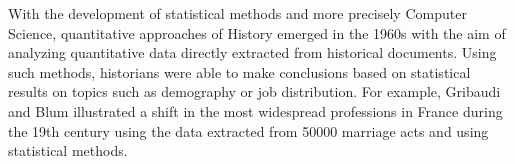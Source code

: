 

With the development of statistical methods and more precisely Computer Science, quantitative approaches of History emerged in the 1960s with the aim of analyzing quantitative data directly extracted from historical documents.
Using such methods, historians were able to make conclusions based on statistical results on topics such as demography \cite{henryRegistresParoissiauxHistoire1956} or job distribution.
For example, Gribaudi and Blum illustrated a shift in the most widespread professions in France during the 19th century using the data extracted from 50000 marriage acts \cite{gribaudi1990} and using statistical methods.

